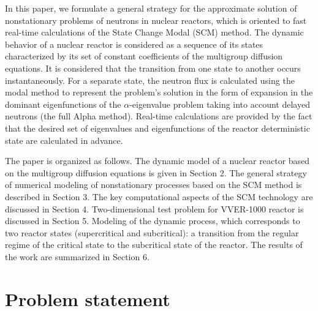 \documentclass[authoryear]{elsarticle}
\begin{document}
In this paper, we formulate a general strategy for the approximate solution of nonstationary problems of neutrons in nuclear reactors, which is oriented to fast real-time calculations of the State Change Modal (SCM) method. The dynamic behavior of a nuclear reactor is considered as a sequence of its states characterized by its set of constant coefficients of the multigroup diffusion equations. It is considered that the transition from one state to another occurs instantaneously. For a separate state, the neutron flux is calculated using the modal method to represent the problem’s solution in the form of expansion in the dominant eigenfunctions of the  $\alpha$-eigenvalue problem
taking into account delayed neutrons (the full Alpha method). Real-time calculations are provided by the fact that the desired set of eigenvalues and eigenfunctions of the reactor deterministic state are calculated in advance.

The paper is organized as follows. The dynamic model of a nuclear reactor based on the multigroup diffusion equations is given in Section 2. The general strategy of numerical modeling of nonstationary processes based on the SCM method is described in Section 3. The key computational aspects of the SCM technology are discussed in Section 4. Two-dimensional test problem for VVER-1000 reactor is discussed in Section 5. Modeling of the dynamic process, which corresponds to two reactor states (supercritical and subcritical): a transition from the regular regime of the critical state to the subcritical state of the reactor. The results of the work are summarized in Section 6.

\section{Problem statement}
\end{document}
